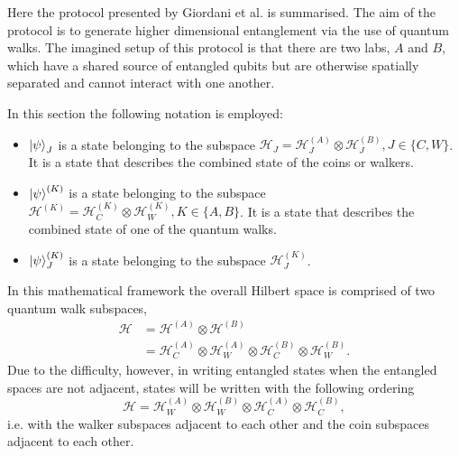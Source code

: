 Here the protocol presented by Giordani et al. \cite{giordani2020} is summarised.
The aim of the protocol is to generate higher dimensional entanglement via the use of quantum walks.
The imagined setup of this protocol is that there are two labs, $A$ and $B$, which have a shared source of entangled qubits but are otherwise spatially separated and cannot interact with one another.

In this section the following notation is employed:
\begin{itemize}
    \item $\ket{\psi}_J$ is a state belonging to the subspace $\mathcal{H}_J = \mathcal{H}^{(A)}_J \otimes \mathcal{H}^{(B)}_J, J\in\{C,W\}$. It is a state that describes the combined state of the coins or walkers.
    \item $\ket{\psi}^{(K)}$ is a state belonging to the subspace $\mathcal{H}^{(K)} = \mathcal{H}^{(K)}_C \otimes \mathcal{H}^{(K)}_W, K\in\{A,B\}$. It is a state that describes the combined state of one of the quantum walks.
    \item  $\ket{\psi}^{(K)}_J$ is a state belonging to the subspace $\mathcal{H}^{(K)}_J$.
\end{itemize}

In this mathematical framework the overall Hilbert space is comprised of two quantum walk subspaces,
\begin{align}
    \mathcal{H} &= \mathcal{H}^{(A)} \otimes \mathcal{H}^{(B)}\\
                &= \mathcal{H}^{(A)}_C \otimes \mathcal{H}^{(A)}_W \otimes \mathcal{H}^{(B)}_C \otimes \mathcal{H}^{(B)}_W.
\end{align}
Due to the difficulty, however, in writing entangled states when the entangled spaces are not adjacent, states will be written with the following ordering
\begin{equation}
    \mathcal{H} = \mathcal{H}^{(A)}_W \otimes \mathcal{H}^{(B)}_W \otimes \mathcal{H}^{(A)}_C \otimes \mathcal{H}^{(B)}_C,
\end{equation} 
i.e. with the walker subspaces adjacent to each other and the coin subspaces adjacent to each other.

